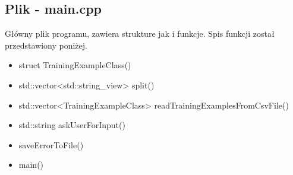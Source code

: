 \documentclass{classrep}
\begin{document}
{        \subsection{Plik - main.cpp}
        {
            Główny plik programu, zawiera strukture jak i funkcje.
            Spis funkcji został przedstawiony poniżej.
            \begin{itemize}
                \item struct TrainingExampleClass()
                \item std::vector<std::string\_view> split()
                \item std::vector<TrainingExampleClass> readTrainingExamplesFromCsvFile()
                \item std::string askUserForInput()
                \item saveErrorToFile()
                \item main()
            \end{itemize}
        }

}
\end{document}

